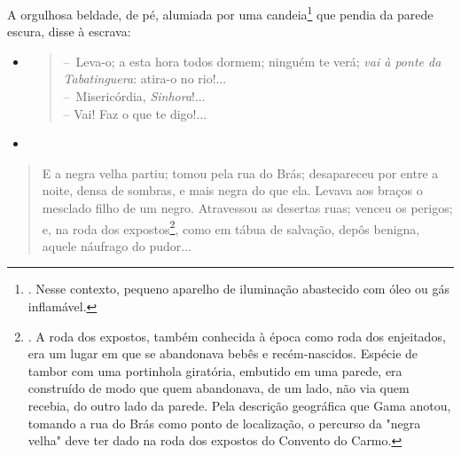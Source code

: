A orgulhosa beldade, de pé, alumiada por uma candeia\footnote{. Nesse
  contexto, pequeno aparelho de iluminação abastecido com óleo ou gás
  inflamável.} que pendia da parede escura, disse à escrava:

\begin{itemize}
\item
  \begin{quote}
  --~Leva-o; a esta hora todos dormem; ninguém te verá; \emph{vai à
  ponte da Tabatinguera}: atira-o no rio!...\\
  --~Misericórdia, \emph{Sinhora}!...\\
  -- Vai! Faz o que te digo!...
  \end{quote}
\item
\end{itemize}

\begin{quote}
E a negra velha partiu; tomou pela rua do Brás; desapareceu por entre a
noite, densa de sombras, e mais negra do que ela. Levava aos braços o
mesclado filho de um negro. Atravessou as desertas ruas; venceu os
perigos; e, na roda dos expostos\footnote{. A roda dos expostos, também
  conhecida à época como roda dos enjeitados, era um lugar em que se
  abandonava bebês e recém-nascidos. Espécie de tambor com uma
  portinhola giratória, embutido em uma parede, era construído de modo
  que quem abandonava, de um lado, não via quem recebia, do outro lado
  da parede. Pela descrição geográfica que Gama anotou, tomando a rua do
  Brás como ponto de localização, o percurso da "negra velha" deve ter
  dado na roda dos expostos do Convento do Carmo.}, como em tábua de
salvação, depôs benigna, aquele náufrago do pudor...
\end{quote}

